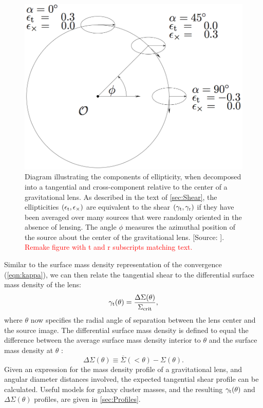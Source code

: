 \begin{figure}
\begin{center}
\includegraphics[scale=0.3]{plots_intro/ShearComponents.png}
\caption[Tangential Shear]{Diagram illustrating the components of ellipticity, when decomposed into a tangential and cross-component relative to the center of a gravitational lens. As described in the text of \autoref{sec:Shear}, the ellipticities $(\epsilon_{\rm t},\epsilon_{\times})$ are equivalent to the shear $(\gamma_{\rm t},\gamma_{\rm r})$ if they have been averaged over many sources that were randomly oriented in the absence of lensing. The angle $\phi$ measures the azimuthal position of the source about the center of the gravitational lens. [Source: \citet{Schneider06_WeakGravLens}]. \textcolor{red}{Remake figure with t and r subscripts matching text.}}
\label{plot:shearcomponents}
\end{center}
\end{figure}

Similar to the surface mass density representation of the convergence (\autoref{eqn:kappa}), we can then relate the tangential shear to the differential surface mass density of the lens:
\begin{equation}
\gamma_{\rm t}(\theta) = \frac{\Delta\Sigma(\theta)}{\Sigma_{\rm crit}},
\end{equation}
where $\theta$ now specifies the radial angle of separation between the lens center and the source image. The differential surface mass density is defined to equal the difference between the average surface mass density interior to $\theta$ and the surface mass density at $\theta$ \citep{Wright00}: 
\begin{equation}
\label{eqn:deltasigma}
\Delta\Sigma(\theta) \equiv \overline{\Sigma}(< \theta) - \Sigma(\theta).
\end{equation}
Given an expression for the mass density profile of a gravitational lens, and angular diameter distances involved, the expected tangential shear profile can be calculated. Useful models for galaxy cluster masses, and the resulting $\gamma_{\rm t}(\theta)$ and $\Delta\Sigma(\theta)$ profiles, are given in \autoref{sec:Profiles}.

